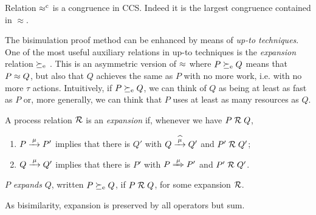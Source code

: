 \begin{theorem}
\label{t:rapproxCongruence}
Relation $\mathrel{\approx^{\rm{c}}}$ is a congruence in CCS.  Indeed it is the
largest congruence contained in $\approx$.
\end{theorem}  

The bisimulation proof method can be enhanced by means of \emph{up-to
  techniques}. One of the most useful auxiliary relations in up-to
techniques  is the \emph{expansion} relation  $\mathrel{\succeq_{\rm{e}}}$ \cite{SaMi92}. This is an asymmetric version
of $\approx$ where $P \mathrel{\succeq_{\rm{e}}} Q$  means that 
 $P \approx Q$,
but also that $Q$  achieves  the same as  $P$ 
with  no more work, i.e. with no more $\tau$ actions.
Intuitively, if $ P \mathrel{\succeq_{\rm{e}}} Q$, we can think of $Q$ as being 
at least as fast as $P$
or, more generally, we can think that $P$  uses at least as many resources as $Q$.

\begin{definition}[expansion]
\label{d:expa}
A process relation ${{\cal R}}$ 
 is an {\em  expansion} if, whenever
we have $P\mathrel{\cal R} Q$, %
\begin{enumerate}
\item   $P \arr\mu P'$ implies that there is $Q'$ with $Q \arcap \mu
  Q'$
 and $P' \mathrel{\cal R} Q'$;
\item 
    $Q \arr\mu Q'$   implies that there is $P'$ with $P \Arr \mu
 P'$ and $P' 
\mathrel{\cal R} Q'$.
\end{enumerate}
 $P$  {\em expands} $Q$, written
$P  \mathrel{\succeq_{\rm{e}}} Q$, 
if $P \mathrel{\cal R} Q$,  for some expansion ${\cal R}$. 
\end{definition}

As bisimilarity, expansion is preserved by all operators but sum.
